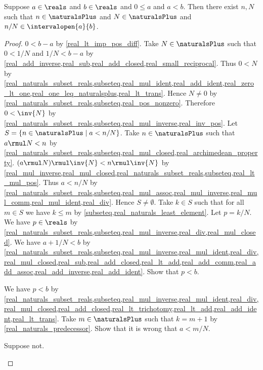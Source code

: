 \begin{lemma}\label{real_rationals_nonneg_interval}
    Suppose $a\in\reals$ and $b\in\reals$ and $0 \leq a$ and $a < b$.
    Then there exist $n, N$ such that $n\in\naturalsPlus$ and $N\in\naturalsPlus$ and $n / N\in\intervalopen{a}{b}$.
\end{lemma}
\begin{proof}
    $0 < b - a$ by \cref{real_lt_imp_pos_diff}.
    Take $N\in\naturalsPlus$ such that $0 < 1 / N$ and $1 / N < b - a$ by \cref{real_add_inverse,real_sub,real_add_closed,real_small_reciprocal}.
    Thus $0 < N$ by \cref{real_naturals_subset_reals,subseteq,real_mul_ident,real_add_ident,real_zero_lt_one,real_one_leq_naturalsplus,real_lt_trans}.
    Hence $N\neq 0$ by \cref{real_naturals_subset_reals,subseteq,real_pos_nonzero}.
    Therefore $0 < \inv{N}$ by \cref{real_naturals_subset_reals,subseteq,real_mul_inverse,real_inv_pos}.
    Let $S = \{ n\in\naturalsPlus \mid a < n / N\}$.
    Take $n\in\naturalsPlus$ such that $a \rmul N < n$ by \cref{real_naturals_subset_reals,subseteq,real_mul_closed,real_archimedean_property}.
    $(a \rmul N) \rmul \inv{N} < n \rmul \inv{N}$ by \cref{real_mul_inverse,real_mul_closed,real_naturals_subset_reals,subseteq,real_lt_mul_pos}.
    Thus $a < n / N$ by \cref{real_naturals_subset_reals,subseteq,real_mul_assoc,real_mul_inverse,real_mul_comm,real_mul_ident,real_div}.
    Hence $S\neq \emptyset$.
    Take $k\in S$ such that for all $m\in S$ we have $k \leq m$ by \cref{subseteq,real_naturals_least_element}.
    Let $p = k / N$.
    We have $p\in\reals$ by \cref{real_naturals_subset_reals,subseteq,real_mul_inverse,real_div,real_mul_closed}.
    We have $a + 1 / N < b$ by \cref{real_naturals_subset_reals,subseteq,real_mul_inverse,real_mul_ident,real_div,real_mul_closed,real_sub,real_add_closed,real_lt_add,real_add_comm,real_add_assoc,real_add_inverse,real_add_ident}.
    Show that $p < b$.
    \begin{subproof}
        \begin{byCase}
            We have $p < b$ by \cref{real_naturals_subset_reals,subseteq,real_mul_inverse,real_mul_ident,real_div,real_mul_closed,real_add_closed,real_lt_trichotomy,real_lt_add,real_add_ident,real_lt_trans}.
            Take $m\in\naturalsPlus$ such that $k = m + 1$ by \cref{real_naturals_predecessor}.
            Show that it is wrong that $a < m / N$.
            \begin{subproof}
                Suppose not.

\end{subproof}
\end{byCase}
\end{subproof}
\end{proof}

